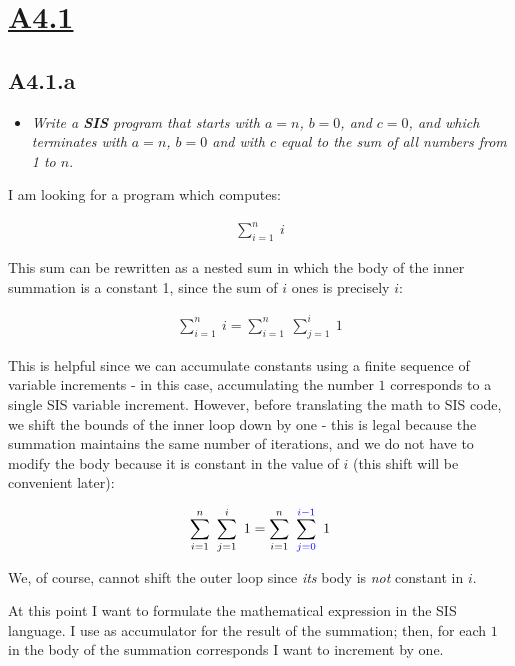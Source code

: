 \newpage
\section{\underline{A4.1}}

\subsection{A4.1.a}


\begin{itemize}
  \item \emph{Write a \textbf{SIS} program that starts with $a = n$, $b = 0$,
    and $c = 0$, and which terminates with $a = n$, $b = 0$ and with $c$ equal
    to the sum of all numbers from 1 to $n$}.
\end{itemize}


I am looking for a program which computes:

\begin{align*}
  \sum_{i = 1}^n\ i
\end{align*}

This sum can be rewritten as a nested sum in which the body of the inner
summation is a constant 1, since the sum of $i$ ones is precisely $i$:

\begin{align*}
  \sum_{i = 1}^n\ i = \sum_{i = 1}^n\ \sum_{j = 1}^{i}\ 1
\end{align*}

This is helpful since we can accumulate constants using a finite sequence of
variable increments - in this case, accumulating the number $1$ corresponds to a
single SIS variable increment. However, before translating the math to SIS code,
we shift the bounds of the inner loop down by one - this is legal because the
summation maintains the same number of iterations, and we do not have to modify
the body because it is constant in the value of $i$ (this shift will be
convenient later):

\begin{align}
  \sum_{i = 1}^n\ \sum_{j = 1}^{i}\ 1 = \sum_{i = 1}^n\ \sum_{\textcolor{blue}{j =
  0}}^{\textcolor{blue}{i - 1}}\ 1 \label{sum}
\end{align}

We, of course, cannot shift the outer loop since \emph{its} body is \emph{not}
constant in $i$.

At this point I want to formulate the mathematical expression in the SIS
language. I use  as accumulator for the result of the summation; then, for
each $1$ in the body of the summation corresponds I want to increment  by
one. 

